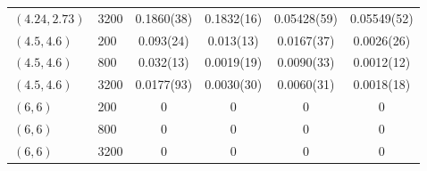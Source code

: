 \begin{table}
\begin{tabular}{llcccc}
$(4.24,2.73)$ & 3200 & 0.1860(38) & 0.1832(16) & 0.05428(59) & 0.05549(52) \\
$(4.5,4.6)$ & 200 & 0.093(24) & 0.013(13) & 0.0167(37) & 0.0026(26) \\
$(4.5,4.6)$ & 800 & 0.032(13) & 0.0019(19) & 0.0090(33) & 0.0012(12) \\
$(4.5,4.6)$ & 3200 & 0.0177(93) & 0.0030(30) & 0.0060(31) & 0.0018(18) \\
$(6,6)$ & 200 & 0 & 0 & 0 & 0 \\
$(6,6)$ & 800 & 0 & 0 & 0 & 0 \\
$(6,6)$ & 3200 & 0 & 0 & 0 & 0 \\
\hline\hline
\end{tabular}
\end{table}
